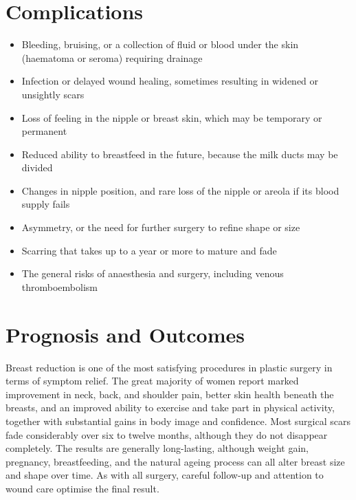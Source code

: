 \section*{Complications}
\begin{itemize}
    \item Bleeding, bruising, or a collection of fluid or blood under the skin (haematoma or seroma) requiring drainage
    \item Infection or delayed wound healing, sometimes resulting in widened or unsightly scars
    \item Loss of feeling in the nipple or breast skin, which may be temporary or permanent
    \item Reduced ability to breastfeed in the future, because the milk ducts may be divided
    \item Changes in nipple position, and rare loss of the nipple or areola if its blood supply fails
    \item Asymmetry, or the need for further surgery to refine shape or size
    \item Scarring that takes up to a year or more to mature and fade
    \item The general risks of anaesthesia and surgery, including venous thromboembolism
\end{itemize}

\section*{Prognosis and Outcomes}
Breast reduction is one of the most satisfying procedures in plastic surgery in terms of symptom relief. The great majority of women report marked improvement in neck, back, and shoulder pain, better skin health beneath the breasts, and an improved ability to exercise and take part in physical activity, together with substantial gains in body image and confidence. Most surgical scars fade considerably over six to twelve months, although they do not disappear completely. The results are generally long-lasting, although weight gain, pregnancy, breastfeeding, and the natural ageing process can all alter breast size and shape over time. As with all surgery, careful follow-up and attention to wound care optimise the final result.

